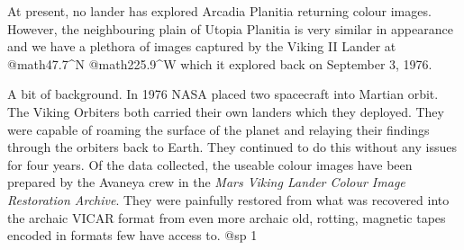 
At present, no lander has explored Arcadia Planitia returning colour images. However, the neighbouring plain of Utopia Planitia is very similar in appearance and we have a plethora of images captured by the Viking II Lander at @math{47.7^{\circ}}N @math{225.9^{\circ}}W which it explored back on September 3, 1976.

A bit of background. In 1976 NASA placed two spacecraft into Martian orbit. The Viking Orbiters both carried their own landers which they deployed. They were capable of roaming the surface of the planet and relaying their findings through the orbiters back to Earth. They continued to do this without any issues for four years. Of the data collected, the useable colour images have been prepared by the Avaneya crew in the {\sl Mars Viking Lander Colour Image Restoration Archive}. They were painfully restored from what was recovered into the archaic VICAR format from even more archaic old, rotting, magnetic tapes encoded in formats few have access to.
@sp 1


